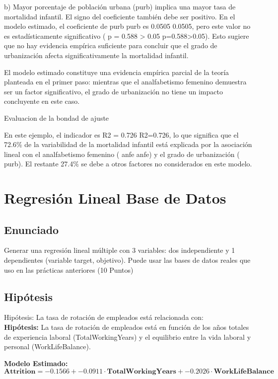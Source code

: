 b) Mayor porcentaje de población urbana (purb) 
implica una mayor tasa de mortalidad infantil. 
El signo del coeficiente también debe ser positivo. 
En el modelo estimado, el coeficiente de purb purb es  
0.0505 0.0505, pero este valor no es estadísticamente significativo 
( p = 0.588 > 0.05 p=0.588>0.05). 
Esto sugiere que no hay evidencia empírica suficiente para concluir 
que el grado de urbanización afecta significativamente la mortalidad infantil.

El modelo estimado constituye una evidencia empírica parcial de la teoría planteada en el primer paso: mientras que el analfabetismo femenino demuestra ser un factor significativo, el grado de urbanización no tiene un impacto concluyente en este caso.



Evaluacion de la bondad de ajuste

En este ejemplo, el indicador es R2 = 0.726 
R2=0.726, lo que significa que el 72.6\% de la variabilidad de la 
mortalidad infantil está explicada por la asociación lineal 
con el analfabetismo femenino ( anfe anfe) y el grado de urbanización ( purb).
El restante 27.4\% 
se debe a otros factores no considerados en este modelo.

\section{Regresión Lineal Base de Datos}
\subsection{Enunciado}
Generar una regresión lineal múltiple con 3 variables: dos  independiente y 1 dependientes (variable target, objetivo). Puede usar las bases de datos reales que uso en las prácticas anteriores  (10 Puntos)

\subsection{Hipótesis}
Hipótesis: La tasa de rotación de empleados está relacionada con: \\


\textbf{Hipótesis:} La tasa de rotación de empleados está en función de los años totales de experiencia laboral (TotalWorkingYears) y el equilibrio entre la vida laboral y personal (WorkLifeBalance).

\textbf{Modelo Estimado:} 
\[
\textbf{Attrition} = -0.1566 + -0.0911 \cdot \textbf{TotalWorkingYears} + -0.2026 \cdot \textbf{WorkLifeBalance}
\]

